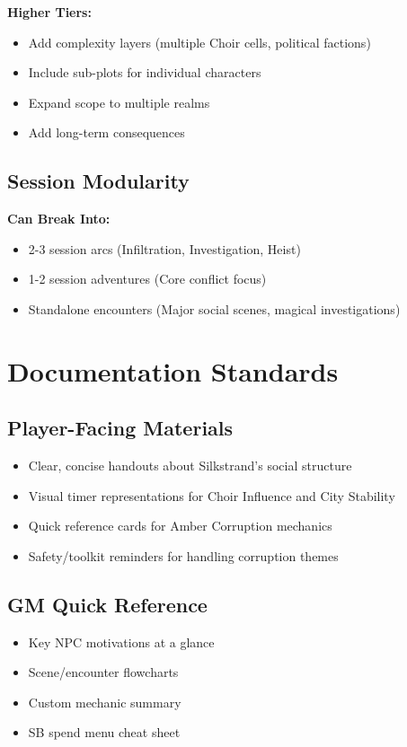 \documentclass[11pt]{article}
\begin{document}
\textbf{Higher Tiers:}
\begin{itemize}
  \item Add complexity layers (multiple Choir cells, political factions)
  \item Include sub-plots for individual characters
  \item Expand scope to multiple realms
  \item Add long-term consequences
\end{itemize}

\subsection*{Session Modularity}

\textbf{Can Break Into:}
\begin{itemize}
  \item 2-3 session arcs (Infiltration, Investigation, Heist)
  \item 1-2 session adventures (Core conflict focus)
  \item Standalone encounters (Major social scenes, magical investigations)
\end{itemize}

\section*{Documentation Standards}

\subsection*{Player-Facing Materials}

\begin{itemize}
  \item Clear, concise handouts about Silkstrand's social structure
  \item Visual timer representations for Choir Influence and City Stability
  \item Quick reference cards for Amber Corruption mechanics
  \item Safety/toolkit reminders for handling corruption themes
\end{itemize}

\subsection*{GM Quick Reference}

\begin{itemize}
  \item Key NPC motivations at a glance
  \item Scene/encounter flowcharts
  \item Custom mechanic summary
  \item SB spend menu cheat sheet
\end{itemize}
\end{document}
